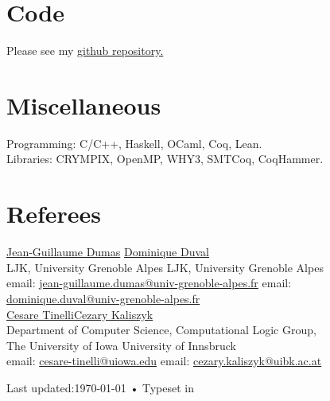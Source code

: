 \documentclass[10pt, a4paper]{article}
\begin{document}
\section*{Code}
Please see my \href{https://github.com/ekiciburak}{github repository.}
\section*{Miscellaneous}
Programming: C/C++, Haskell, OCaml, Coq, Lean. \\
Libraries: CRYMPIX, OpenMP, WHY3, SMTCoq, CoqHammer.
\section*{Referees}
\href{http://ljk.imag.fr/membres/Jean-Guillaume.Dumas/}{Jean-Guillaume Dumas} \hfill \href{http://ljk.imag.fr/membres/Dominique.Duval/}{Dominique Duval}\\
LJK, University Grenoble Alpes \hfill LJK, University Grenoble Alpes\\
email: \href{mailto:jean-guillaume.dumas@univ-grenoble-alpes.fr}{jean-guillaume.dumas@univ-grenoble-alpes.fr} \hfill email: \href{mailto:dominique.duval@univ-grenoble-alpes.fr}{dominique.duval@univ-grenoble-alpes.fr}\\

\href{http://homepage.cs.uiowa.edu/~tinelli/index.html}{Cesare Tinelli}\hfill \href{http://cl-informatik.uibk.ac.at/users/cek/}{Cezary Kaliszyk}\\
Department of Computer Science, \hfill Computational Logic Group,\\
The University of Iowa \hfill University of Innsbruck\\
email: \href{mailto:cesare-tinelli@uiowa.edu}{cesare-tinelli@uiowa.edu} \hfill email: \href{mailto:cezary.kaliszyk@uibk.ac.at}{cezary.kaliszyk@uibk.ac.at}\\


\begin{center}
{\scriptsize  Last updated:\today\- •\- 
Typeset in \href{http://en.wikipedia.org/wiki/XeTeX}{
\XeTeX}}
\end{center}
\end{document}

